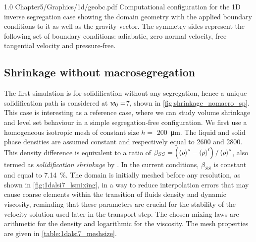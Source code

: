\begin{figureth}
{1.0}
{Chapter5/Graphics/1d/geobc.pdf}
{Computational configuration for the 1D inverse segregation case showing the domain geometry 
with the applied boundary conditions to it as well as the gravity vector.
The symmetry sides represent the following set of boundary conditions: 
adiabatic, zero normal velocity, free tangential velocity and pressure-free.}
\label{fig:1d_alsi7_geobc}
\end{figureth}

%
\subsection{Shrinkage without macrosegregation}

The first simulation is for solidification without any segregation, hence a unique solidification path is considered at ${w}_0=$\SI{7}{\ucomposition},
shown in \cref{fig:shrinkage_nomacro_sp}.
This case is interesting as a reference case, where we can study volume shrinkage and level set behaviour in a simple segregation-free configuration.
We first use a homogeneous isotropic mesh of constant size $h=$ \SI{200}{\micro \metre}. The liquid and solid phase densities are assumed constant
and respectively equal to \SI{2600}{\udensity} and \SI{2800}{\udensity}. This density difference is equivalent to a ratio of $\beta_{SS}= \left( \left \langle \rho \right \rangle^s-\left \langle \rho \right \rangle^l \right)/\left \langle \rho \right \rangle^s$,
also termed as \emph{solidification shrinkage} by \citet{flemings_macrosegregation:_1967}. 
In the current conditions, $\beta_{SS}$ is constant and equal to \SI{7.14}{\percent}. 
The domain is initially meshed before any resolution, as shown in \cref{fig:1dalsi7_lsmixing}, in a way to reduce interpolation errors that may
cause coarse elements within the transition of fluids density and dynamic viscosity, reminding that these parameters are crucial for the stability 
of the velocity solution used later in the transport step. The chosen mixing laws are arithmetic for the density and logarithmic for the viscosity.
The mesh properties are given in \cref{table:1dalsi7_meshsize}.

